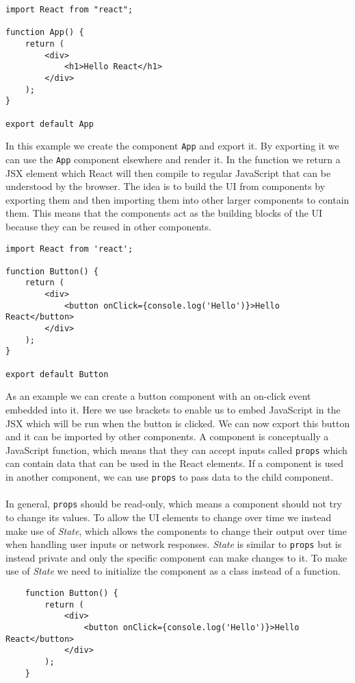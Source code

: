 \begin{lstlisting}
import React from "react";

function App() {
    return (
        <div>
            <h1>Hello React</h1>
        </div>
    );
}

export default App
\end{lstlisting}
In this example we create the component \texttt{App} and export it.
By exporting it we can use the \texttt{App} component elsewhere and render it.
In the function we return a JSX element which React will then compile to regular JavaScript that can be understood by the browser.
The idea is to build the UI from components by exporting them and then importing them into other larger components to contain them.
This means that the components act as the building blocks of the UI because they can be reused in other components.
\begin{lstlisting}
import React from 'react';

function Button() {
    return (
        <div>
            <button onClick={console.log('Hello')}>Hello React</button>
        </div>
    );
}

export default Button
\end{lstlisting}
As an example we can create a button component with an on-click event embedded into it.
Here we use brackets to enable us to embed JavaScript in the JSX which will be run when the button is clicked.
We can now export this button and it can be imported by other components.
A component is conceptually a JavaScript function, which means that they can accept inputs called \texttt{props} which can contain data that can be used in the React elements.
If a component is used in another component, we can use \texttt{props} to pass data to the child component.
\\\\
In general, \texttt{props} should be read-only, which means a component should not try to change its values.
To allow the UI elements to change over time we instead make use of \textit{State}, which allows the components to change their output over time when handling user inputs or network responses.
\textit{State} is similar to \texttt{props} but is instead private and only the specific component can make changes to it.
To make use of \textit{State} we need to initialize the component as a class instead of a function.
\begin{lstlisting}
    function Button() {
        return (
            <div>
                <button onClick={console.log('Hello')}>Hello React</button>
            </div>
        );
    }
\end{lstlisting}
